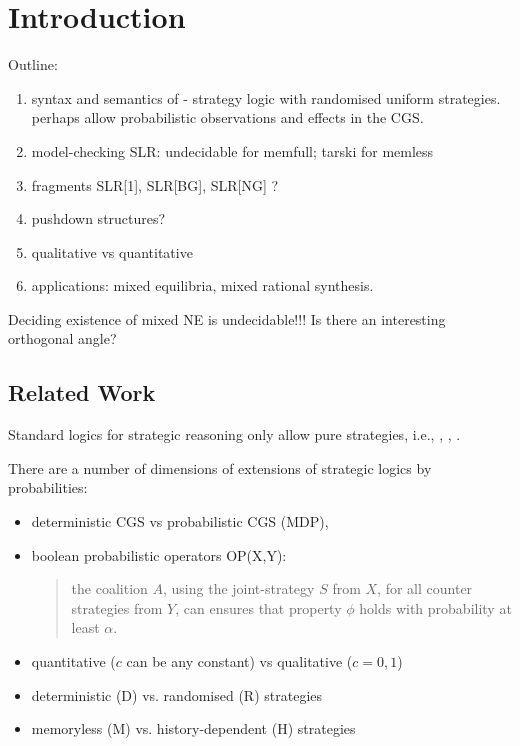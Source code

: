 \section{Introduction}

Outline:
\begin{enumerate}
 \item syntax and semantics of \SLR - strategy logic with randomised uniform strategies. perhaps allow probabilistic observations and effects in the CGS.
 \item model-checking SLR: undecidable for memfull; tarski for memless
 \item fragments SLR[1], SLR[BG], SLR[NG] ?
 \item pushdown structures?
 \item qualitative vs quantitative
 \item applications: mixed equilibria, mixed rational synthesis.
\end{enumerate}


Deciding existence of mixed NE is undecidable!!! Is there an interesting orthogonal angle?

\subsection{Related Work}

Standard logics for strategic reasoning only allow pure strategies, i.e., \ATL, \ATLS, \SL. 

There are a number of dimensions of extensions of strategic logics by probabilities:
\begin{itemize}
 \item deterministic CGS vs probabilistic CGS (MDP),
 \item boolean probabilistic operators OP(X,Y): 
\begin{quote}
the coalition $A$, using the joint-strategy $S$ from $X$, for all counter strategies from $Y$, can ensures that property $\phi$ holds with probability at least $\alpha$. 
\end{quote}
 \item quantitative ($c$ can be any constant) vs qualitative ($c = 0,1$)
 \item deterministic (D) vs. randomised (R) strategies
 \item memoryless (M) vs. history-dependent (H) strategies
\end{itemize}


